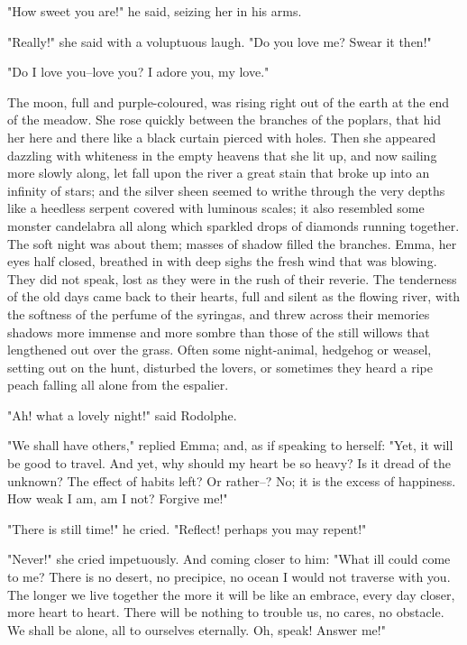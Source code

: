 \documentclass{tufte-book}
\begin{document}
"How sweet you are!" he said, seizing her in his arms.

"Really!" she said with a voluptuous laugh. "Do you love me? Swear it
then!"

"Do I love you--love you? I adore you, my love."

The moon, full and purple-coloured, was rising right out of the earth
at the end of the meadow. She rose quickly between the branches of the
poplars, that hid her here and there like a black curtain pierced with
holes. Then she appeared dazzling with whiteness in the empty heavens
that she lit up, and now sailing more slowly along, let fall upon the
river a great stain that broke up into an infinity of stars; and the
silver sheen seemed to writhe through the very depths like a heedless
serpent covered with luminous scales; it also resembled some monster
candelabra all along which sparkled drops of diamonds running together.
The soft night was about them; masses of shadow filled the branches.
Emma, her eyes half closed, breathed in with deep sighs the fresh wind
that was blowing. They did not speak, lost as they were in the rush of
their reverie. The tenderness of the old days came back to their hearts,
full and silent as the flowing river, with the softness of the perfume
of the syringas, and threw across their memories shadows more immense
and more sombre than those of the still willows that lengthened out over
the grass. Often some night-animal, hedgehog or weasel, setting out on
the hunt, disturbed the lovers, or sometimes they heard a ripe peach
falling all alone from the espalier.

"Ah! what a lovely night!" said Rodolphe.

"We shall have others," replied Emma; and, as if speaking to herself:
"Yet, it will be good to travel. And yet, why should my heart be
so heavy? Is it dread of the unknown? The effect of habits left? Or
rather--? No; it is the excess of happiness. How weak I am, am I not?
Forgive me!"

"There is still time!" he cried. "Reflect! perhaps you may repent!"

"Never!" she cried impetuously. And coming closer to him: "What ill
could come to me? There is no desert, no precipice, no ocean I would not
traverse with you. The longer we live together the more it will be like
an embrace, every day closer, more heart to heart. There will be
nothing to trouble us, no cares, no obstacle. We shall be alone, all to
ourselves eternally. Oh, speak! Answer me!"
\end{document}
